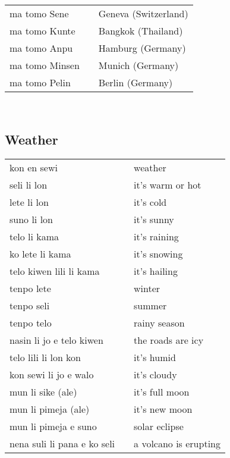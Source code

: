 \begin{supertabular}{p{4,5cm}|ll}
    ma tomo Sene                      &  & Geneva (Switzerland)      \\
    ma tomo Kunte                     &  & Bangkok (Thailand)        \\
    ma tomo Anpu                      &  & Hamburg (Germany)         \\
    ma tomo Minsen                    &  & Munich (Germany)          \\
    ma tomo Pelin                     &  & Berlin (Germany)          \\
\end{supertabular} \\

\subsection{Weather}

\begin{supertabular}{p{4,5cm}|ll}
    kon en sewi                 &  & weather               \\

    seli li lon                 &  & it's warm or hot      \\
    lete li lon                 &  & it's cold             \\
    suno li lon                 &  & it's sunny            \\
    telo li kama                &  & it's raining          \\
    ko lete li kama             &  & it's snowing          \\
    telo kiwen lili li kama     &  & it's hailing          \\
    tenpo lete                  &  & winter                \\
    tenpo seli                  &  & summer                \\
    tenpo telo                  &  & rainy season          \\
    nasin li jo e telo kiwen    &  & the roads are icy     \\
    telo lili li lon kon        &  & it's humid            \\
    kon sewi li jo e walo       &  & it's cloudy           \\
    mun li sike (ale)           &  & it's full moon        \\
    mun li pimeja (ale)         &  & it's new moon         \\
    mun li pimeja e suno        &  & solar eclipse         \\
    nena suli li pana e ko seli &  & a volcano is erupting \\
\end{supertabular} \\
